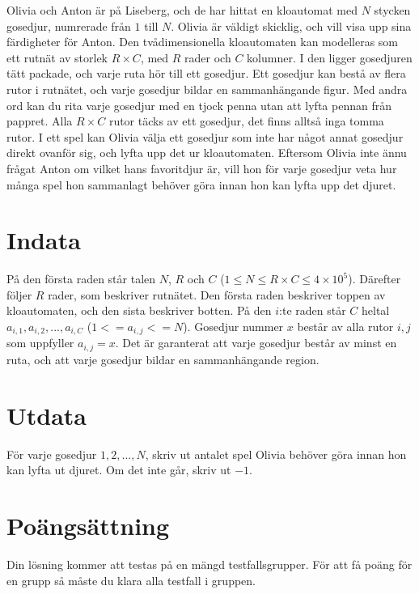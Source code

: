 Olivia och Anton är på Liseberg, och de har hittat en kloautomat med $N$ stycken gosedjur, numrerade från $1$ till $N$.
Olivia är väldigt skicklig, 
och vill visa upp sina färdigheter för Anton.
Den tvådimensionella kloautomaten kan modelleras som ett rutnät av storlek $R \times C$, 
med $R$ rader och $C$ kolumner. 
I den ligger gosedjuren tätt packade, 
och varje ruta hör till ett gosedjur.
Ett gosedjur kan bestå av flera rutor i rutnätet, och varje gosedjur bildar
en sammanhängande figur. 
Med andra ord kan du rita varje gosedjur med en tjock penna utan att lyfta pennan från pappret.
Alla $R \times C$ rutor täcks av ett gosedjur, det finns alltså inga tomma rutor.
I ett spel kan Olivia välja ett gosedjur som inte har något annat gosedjur direkt ovanför sig, 
och lyfta upp det ur kloautomaten.
Eftersom Olivia inte ännu frågat Anton om vilket hans favoritdjur är, 
vill hon för varje gosedjur veta hur många spel hon sammanlagt behöver göra innan hon kan lyfta upp det djuret.

\noindent

\section*{Indata}
På den första raden står talen $N$, $R$ och $C$ ($1 \leq N \leq R \times C \leq 4 \times 10^{5}$).
Därefter följer $R$ rader, som beskriver rutnätet. 
Den första raden beskriver toppen av kloautomaten, och den sista beskriver botten.
På den $i$:te raden står $C$ heltal $a_{i,1}, a_{i,2}, ..., a_{i,C}$ ($1 <= a_{i,j} <= N$).
Gosedjur nummer $x$ består av alla rutor $i,j$ som uppfyller $a_{i,j} = x$.
Det är garanterat att varje gosedjur består av minst en ruta, och att varje gosedjur bildar en sammanhängande region.

\section*{Utdata}
För varje gosedjur $1, 2, ..., N$, skriv ut antalet spel Olivia behöver göra innan hon kan lyfta ut djuret.
Om det inte går, skriv ut $-1$.

\section*{Poängsättning}
Din lösning kommer att testas på en mängd testfallsgrupper.
För att få poäng för en grupp så måste du klara alla testfall i gruppen.

